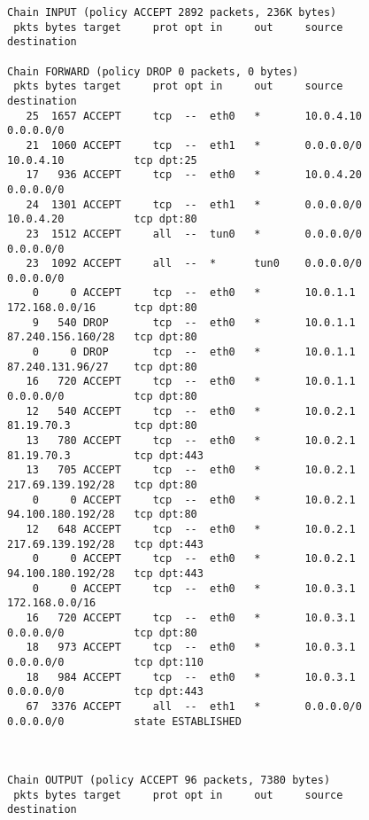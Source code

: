 \documentclass[a4paper,12pt]{article}
\begin{document}
\begin{Verbatim}
Chain INPUT (policy ACCEPT 2892 packets, 236K bytes)
 pkts bytes target     prot opt in     out     source               destination         

Chain FORWARD (policy DROP 0 packets, 0 bytes)
 pkts bytes target     prot opt in     out     source               destination         
   25  1657 ACCEPT     tcp  --  eth0   *       10.0.4.10            0.0.0.0/0           
   21  1060 ACCEPT     tcp  --  eth1   *       0.0.0.0/0            10.0.4.10           tcp dpt:25 
   17   936 ACCEPT     tcp  --  eth0   *       10.0.4.20            0.0.0.0/0           
   24  1301 ACCEPT     tcp  --  eth1   *       0.0.0.0/0            10.0.4.20           tcp dpt:80 
   23  1512 ACCEPT     all  --  tun0   *       0.0.0.0/0            0.0.0.0/0           
   23  1092 ACCEPT     all  --  *      tun0    0.0.0.0/0            0.0.0.0/0           
    0     0 ACCEPT     tcp  --  eth0   *       10.0.1.1             172.168.0.0/16      tcp dpt:80 
    9   540 DROP       tcp  --  eth0   *       10.0.1.1             87.240.156.160/28   tcp dpt:80 
    0     0 DROP       tcp  --  eth0   *       10.0.1.1             87.240.131.96/27    tcp dpt:80 
   16   720 ACCEPT     tcp  --  eth0   *       10.0.1.1             0.0.0.0/0           tcp dpt:80 
   12   540 ACCEPT     tcp  --  eth0   *       10.0.2.1             81.19.70.3          tcp dpt:80 
   13   780 ACCEPT     tcp  --  eth0   *       10.0.2.1             81.19.70.3          tcp dpt:443 
   13   705 ACCEPT     tcp  --  eth0   *       10.0.2.1             217.69.139.192/28   tcp dpt:80 
    0     0 ACCEPT     tcp  --  eth0   *       10.0.2.1             94.100.180.192/28   tcp dpt:80 
   12   648 ACCEPT     tcp  --  eth0   *       10.0.2.1             217.69.139.192/28   tcp dpt:443 
    0     0 ACCEPT     tcp  --  eth0   *       10.0.2.1             94.100.180.192/28   tcp dpt:443 
    0     0 ACCEPT     tcp  --  eth0   *       10.0.3.1             172.168.0.0/16      
   16   720 ACCEPT     tcp  --  eth0   *       10.0.3.1             0.0.0.0/0           tcp dpt:80 
   18   973 ACCEPT     tcp  --  eth0   *       10.0.3.1             0.0.0.0/0           tcp dpt:110 
   18   984 ACCEPT     tcp  --  eth0   *       10.0.3.1             0.0.0.0/0           tcp dpt:443 
   67  3376 ACCEPT     all  --  eth1   *       0.0.0.0/0            0.0.0.0/0           state ESTABLISHED 



Chain OUTPUT (policy ACCEPT 96 packets, 7380 bytes)
 pkts bytes target     prot opt in     out     source               destination
\end{Verbatim}
\end{document}
